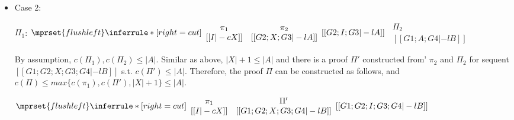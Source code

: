 \begin{itemize}
\item Case 2:
      \begin{center}
        \scriptsize
        $\Pi_1$:
        \begin{math}
          $$\mprset{flushleft}
          \inferrule* [right={\tiny cut}] {
            {
              \begin{array}{cc}
                \pi_1 & \pi_2 \\
                {[[I |-c X]]} & {[[G2; X; G3 |-l A]]}
              \end{array}
            }
          }{[[G2; I; G3 |-l A]]}
        \end{math}
        \qquad\qquad
        \begin{math}
          \begin{array}{c}
            \Pi_2 \\
            {[[G1; A; G4 |-l B]]}
          \end{array}
        \end{math}
      \end{center}
      By assumption, $c(\Pi_1),c(\Pi_2)\leq |A|$. Similar as above,
      $|X|+1\leq |A|$ and there is a proof $\Pi'$ constructed from'
      $\pi_2$ and $\Pi_2$ for sequent $[[G1; G2; X; G3; G4 |-l B]]$ s.t.
      $c(\Pi')\leq|A|$. Therefore, the proof $\Pi$ can be constructed as
      follows, and $c(\Pi)\leq max\{c(\pi_1),c(\Pi'),|X|+1\}\leq |A|$.
      \begin{center}
        \scriptsize
        \begin{math}
          $$\mprset{flushleft}
          \inferrule* [right={\tiny cut}] {
            {
              \begin{array}{cc}
                \pi_1  & \Pi' \\
                {[[I |-c X]]} & {[[G1; G2; X; G3; G4 |-l B]]}
              \end{array}
            }
          }{[[G1; G2; I; G3; G4 |-l B]]}
        \end{math}
      \end{center}
\end{itemize}

